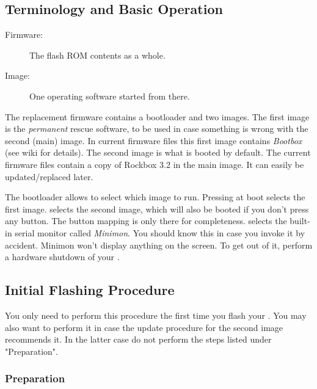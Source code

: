 \subsection{Terminology and Basic Operation}

\begin{description}
\item[Firmware:] The flash ROM contents as a whole.
\item[Image:] One operating software started from there.
\end{description}

The replacement firmware contains a bootloader and two images. The first image
is the \emph{permanent} rescue software, to be used in case something is wrong
with the second (main) image. In current firmware files this first image
contains \emph{Bootbox} (see wiki for details). The second image is what is
booted by default. The current firmware files contain a copy of Rockbox 3.2
in the main image. It can easily be updated/replaced later.

The bootloader allows to select which image to run. Pressing
 at boot
selects the first image.
selects the second image, which will also be booted if you don't press any
button. The button mapping is only there for completeness.
selects the built-in serial monitor called \emph{Minimon}. You should know this
in case you invoke it by accident. Minimon won't display anything on the
screen. To get out of it, perform a hardware shutdown of your \dap.

\subsection{Initial Flashing Procedure}

You only need to perform this procedure the first time you flash your
\playertype. You may also want to perform it in case the update procedure for
the second image recommends it. In the latter case do not perform the steps
listed under "Preparation".

\subsubsection{Preparation}


